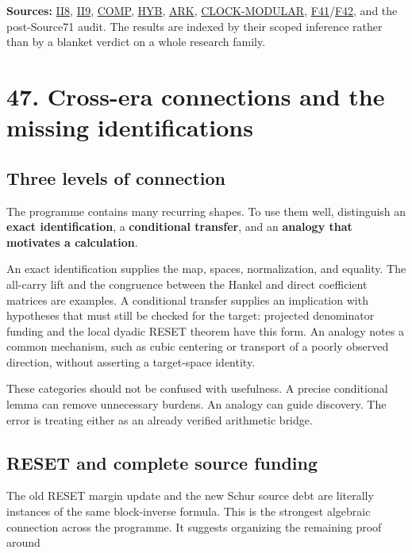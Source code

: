 \documentclass[
  10pt,
  a4paper,
  10pt,
  oneside,
  openany]{book}
\begin{document}
\textbf{Sources:} \hyperref[source-ii8]{II8},
\hyperref[source-ii9]{II9}, \hyperref[source-comp]{COMP},
\hyperref[source-hyb]{HYB}, \hyperref[source-ark]{ARK},
\hyperref[source-clock-modular]{CLOCK-MODULAR},
\hyperref[source-f41]{F41}/\hyperref[source-f42]{F42}, and the
post-Source71 audit. The results are indexed by their scoped inference
rather than by a blanket verdict on a whole research family.

\section{47. Cross-era connections and the missing
identifications}\label{ch-connections}

\subsection{Three levels of
connection}\label{three-levels-of-connection}

The programme contains many recurring shapes. To use them well,
distinguish an \textbf{exact identification}, a \textbf{conditional
transfer}, and an \textbf{analogy that motivates a calculation}.

An exact identification supplies the map, spaces, normalization, and
equality. The all-carry lift and the congruence between the Hankel and
direct coefficient matrices are examples. A conditional transfer
supplies an implication with hypotheses that must still be checked for
the target: projected denominator funding and the local dyadic RESET
theorem have this form. An analogy notes a common mechanism, such as
cubic centering or transport of a poorly observed direction, without
asserting a target-space identity.

These categories should not be confused with usefulness. A precise
conditional lemma can remove unnecessary burdens. An analogy can guide
discovery. The error is treating either as an already verified
arithmetic bridge.

\subsection{RESET and complete source
funding}\label{reset-and-complete-source-funding}

The old RESET margin update and the new Schur source debt are literally
instances of the same block-inverse formula. This is the strongest
algebraic connection across the programme. It suggests organizing the
remaining proof around
\end{document}
